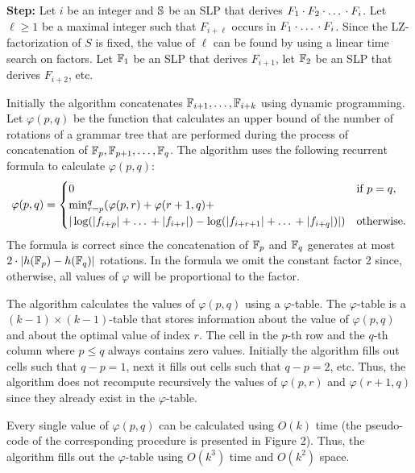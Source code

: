 \documentclass[10pt]{article}
\begin{document}
\textbf{Step:} Let $i$ be an integer and $\mathbb{S}$ be an SLP that derives $F_1\cdot F_2 \cdot \mbox{\dots} \cdot F_i$.
Let $\ell \geq 1$ be a maximal integer such that $F_{i+\ell}$ occurs in $F_1 \cdot \mbox{\dots} \cdot F_i$. Since the
LZ-factorization of $S$ is fixed, the value of $\ell$ can be found by using a linear time search on factors. Let
$\mathbb{F}_1$ be an SLP that derives $F_{i+1}$, let $\mathbb{F}_2$ be an SLP that derives $F_{i+2}$, etc.

Initially the algorithm concatenates $\mathbb{F}_{i+1}, \dots, \mathbb{F}_{i+k}$ using dynamic programming. Let $\varphi(p,
q)$ be the function that calculates an upper bound of the number of rotations of a grammar tree that are performed
during the process of concatenation of $\mathbb{F}_p, \mathbb{F}_{p+1}, \dots, \mathbb{F}_q$. The algorithm uses the following
recurrent formula to calculate $\varphi(p,q)$:
$$\varphi(p, q) = \begin{cases}
0 &\text{if } p=q, \\
\min_{r = p}^q(\varphi(p, r) + \varphi(r+1, q) +&\\
|\log(|f_{i+p}| + \mbox{\dots} + |f_{i+r}|) - \log(|f_{i+r+1}| + \mbox{\dots} + |f_{i+q}|)|) &\mbox{otherwise}.
\end{cases}$$
The formula is correct since the concatenation of $\mathbb{F}_p$ and $\mathbb{F}_q$ generates at most $2\cdot|h(\mathbb{F}_p) -
h(\mathbb{F}_q)|$ rotations. In the formula we omit the constant factor 2 since, otherwise, all values of $\varphi$
will be proportional to the factor.

The algorithm calculates the values of $\varphi(p, q)$ using a $\varphi$-table. The $\varphi$-table is a $(k-1) \times
(k-1)$-table that stores information about the value of $\varphi(p,q)$ and about the optimal value of index $r$. The
cell in the $p$-th row and the $q$-th column where $p \leq q$ always contains zero values. Initially the algorithm fills
out cells such that $q - p = 1$, next it fills out cells such that $q - p = 2$, etc. Thus, the algorithm does not
recompute recursively the values of $\varphi(p, r)$ and $\varphi(r+1, q)$ since they already exist in the $\varphi$-table.

Every single value of $\varphi(p, q)$ can be calculated using $O(k)$ time (the pseudo-code of the corresponding
procedure is presented in Figure 2). Thus, the algorithm fills out the $\varphi$-table using $O(k^3)$ time and $O(k^2)$ space.

\begin{figure}[th]
\ComputingFiValue
\end{figure}
\end{document}
